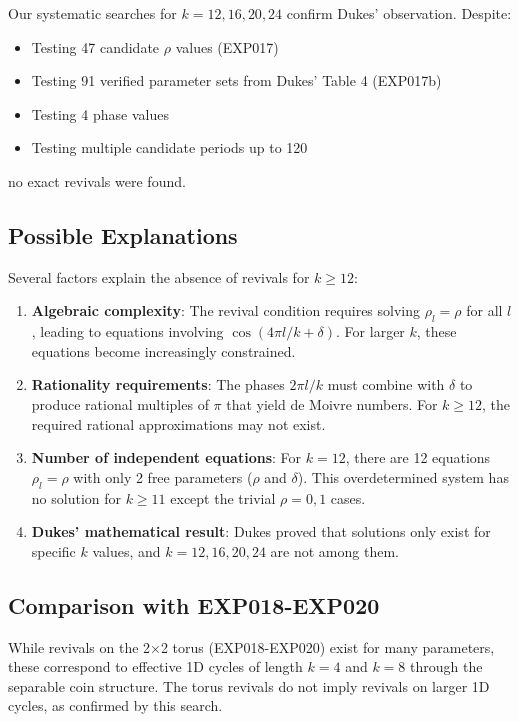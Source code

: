 \documentclass[12pt]{article}
\begin{document}
Our systematic searches for $k = 12, 16, 20, 24$ confirm Dukes' observation. Despite:
\begin{itemize}
    \item Testing 47 candidate $\rho$ values (EXP017)
    \item Testing 91 verified parameter sets from Dukes' Table 4 (EXP017b)
    \item Testing 4 phase values
    \item Testing multiple candidate periods up to 120
\end{itemize}
no exact revivals were found.

\subsection{Possible Explanations}

Several factors explain the absence of revivals for $k \geq 12$:

\begin{enumerate}
    \item \textbf{Algebraic complexity}: The revival condition requires solving $\rho_l = \rho$ for all $l$, leading to equations involving $\cos(4\pi l/k + \delta)$. For larger $k$, these equations become increasingly constrained.
    
    \item \textbf{Rationality requirements}: The phases $2\pi l/k$ must combine with $\delta$ to produce rational multiples of $\pi$ that yield de Moivre numbers. For $k \geq 12$, the required rational approximations may not exist.
    
    \item \textbf{Number of independent equations}: For $k=12$, there are 12 equations $\rho_l = \rho$ with only 2 free parameters ($\rho$ and $\delta$). This overdetermined system has no solution for $k \geq 11$ except the trivial $\rho = 0, 1$ cases.
    
    \item \textbf{Dukes' mathematical result}: Dukes proved that solutions only exist for specific $k$ values, and $k=12,16,20,24$ are not among them.
\end{enumerate}

\subsection{Comparison with EXP018-EXP020}

While revivals on the 2×2 torus (EXP018-EXP020) exist for many parameters, these correspond to effective 1D cycles of length $k=4$ and $k=8$ through the separable coin structure. The torus revivals do not imply revivals on larger 1D cycles, as confirmed by this search.
\end{document}
